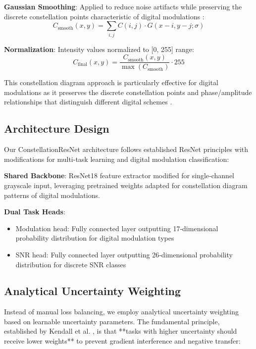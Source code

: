 \documentclass{ELSP}
\begin{document}
\textbf{Gaussian Smoothing}: Applied to reduce noise artifacts while preserving the discrete constellation points characteristic of digital modulations \cite{sun2022amc}:
\begin{equation}
C_{\text{smooth}}(x,y) = \sum_{i,j} C(i,j) \cdot G(x-i, y-j; \sigma)
\end{equation}

\textbf{Normalization}: Intensity values normalized to [0, 255] range:
\begin{equation}
C_{\text{final}}(x,y) = \frac{C_{\text{smooth}}(x,y)}{\max(C_{\text{smooth}})} \cdot 255
\end{equation}

This constellation diagram approach is particularly effective for digital modulations as it preserves the discrete constellation points and phase/amplitude relationships that distinguish different digital schemes \cite{peng2021survey,sun2023novel}.

\subsection{Architecture Design}

Our ConstellationResNet architecture follows established ResNet principles \cite{kumar2023automatic} with modifications for multi-task learning and digital modulation classification:

\textbf{Shared Backbone}: ResNet18 feature extractor modified for single‑channel grayscale input, leveraging pretrained weights adapted for constellation diagram patterns of digital modulations.

\textbf{Dual Task Heads}: 
\begin{itemize}
\item Modulation head: Fully connected layer outputting 17‑dimensional probability distribution for digital modulation types
\item SNR head: Fully connected layer outputting 26‑dimensional probability distribution for discrete SNR classes
\end{itemize}

\subsection{Analytical Uncertainty Weighting}

Instead of manual loss balancing, we employ analytical uncertainty weighting \cite{liu2024analytical} based on learnable uncertainty parameters. The fundamental principle, established by Kendall et al. \cite{kendall2018multi}, is that **tasks with higher uncertainty should receive lower weights** to prevent gradient interference and negative transfer:
\end{document}
